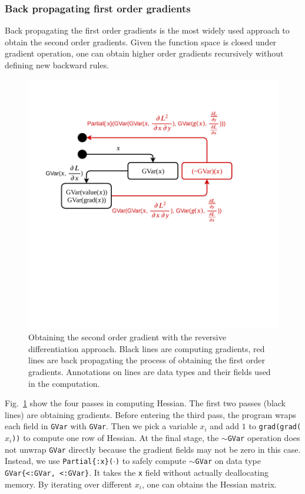 \documentclass[aps,twocolumn,longbibliography,english,superscriptaddress,prr]{revtex4-1}
\newcommand{\<}{\langle}
\renewcommand{\>}{\rangle}
\newcommand{\Fig}[1]{Fig.~\ref{#1}}
\theoremstyle{definition}\newtheorem{definition}{\textit{Definition}}
\begin{document}
\subsubsection{Back propagating first order gradients}
Back propagating the first order gradients is the most widely used approach to obtain the second order gradients. Given the function space is closed under gradient operation, one can obtain higher order gradients recursively without defining new backward rules.
\begin{figure}[h]
    \centerline{\includegraphics[width=\columnwidth,trim={0 6.5cm 1cm 2cm},clip]{images/simplehessian.pdf}}
    \caption{Obtaining the second order gradient with the reversive differentiation approach. Black lines are computing gradients, red lines are back propagating the process of obtaining the first order gradients. Annotations on lines are data types and their fields used in the computation.}\label{fig:simplehessian}
\end{figure}

\Fig{fig:simplehessian} show the four passes in computing Hessian. The first two passes (black lines) are obtaining gradients. Before entering the third pass, the program wraps each field in \texttt{GVar} with \texttt{GVar}. Then we pick a variable $x_i$ and add $1$ to \texttt{grad(grad($x_i$))} to compute one row of Hessian. At the final stage, the \texttt{$\sim$GVar} operation does not unwrap \texttt{GVar} directly because the gradient fields may not be zero in this case. Instead, we use \texttt{Partial\{:x\}($\cdot$)} to safely compute \texttt{$\sim$GVar} on data type \texttt{GVar\{<:GVar, <:GVar\}}. It takes the \texttt{x} field without actually deallocating memory. By iterating over different $x_i$, one can obtains the Hessian matrix.
\end{document}
